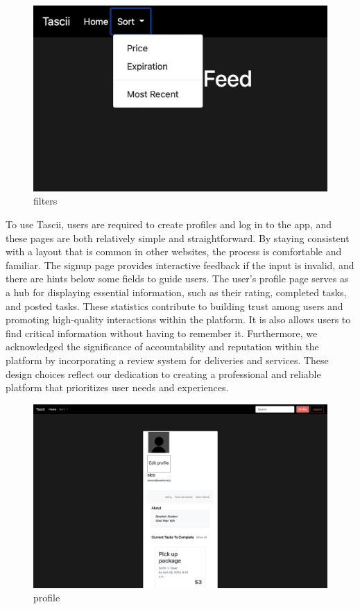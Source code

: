 \begin{figure}[ht]
        \centering
        \caption{filters}
        \includegraphics[width=1\textwidth]{images/Sort.png}
        
        \label{fig:bird1}
    \end{figure}

To use Tascii, users are required to create profiles and log in to the app, and these pages are both relatively simple and straightforward. By staying consistent with a layout that is common in other websites, the process is comfortable and familiar. The signup page provides interactive feedback if the input is invalid, and there are hints below some fields to guide users. The user's profile page serves as a hub for displaying essential information, such as their rating, completed tasks, and posted tasks. These statistics contribute to building trust among users and promoting high-quality interactions within the platform. It is also allows users to find critical information without having to remember it. Furthermore, we acknowledged the significance of accountability and reputation within the platform by incorporating a review system for deliveries and services. These design choices reflect our dedication to creating a professional and reliable platform that prioritizes user needs and experiences.

\begin{figure}[ht]
        \centering
        \caption{profile}
        \includegraphics[width=1\textwidth]{images/Profile.png}
        
        \label{fig:bird1}
    \end{figure}

